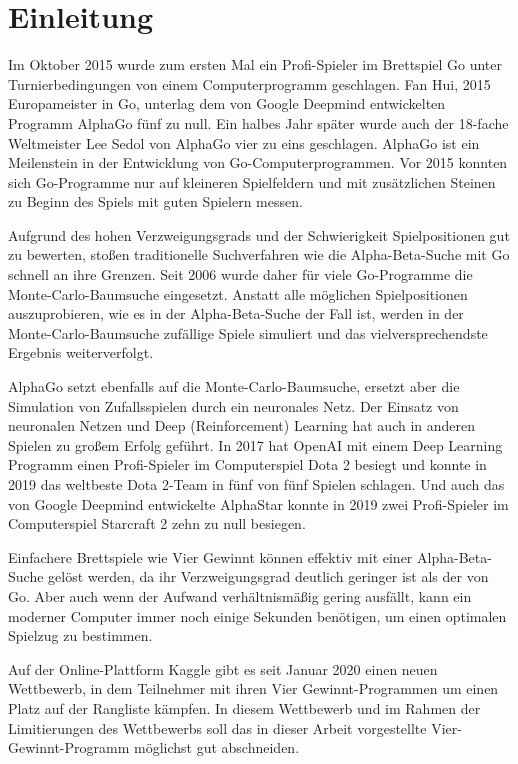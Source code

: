 \section{Einleitung}

Im Oktober 2015 wurde zum ersten Mal ein Profi-Spieler im Brettspiel Go unter Turnierbedingungen von einem Computerprogramm geschlagen. Fan Hui, 2015 Europameister in Go, unterlag dem von Google Deepmind entwickelten Programm AlphaGo fünf zu null. Ein halbes Jahr später wurde auch der 18-fache Weltmeister Lee Sedol von AlphaGo vier zu eins geschlagen.\autocite{AlphaGoStoryFar} AlphaGo ist ein Meilenstein in der Entwicklung von Go-Computerprogrammen. Vor 2015 konnten sich Go-Programme nur auf kleineren Spielfeldern und mit zusätzlichen Steinen zu Beginn des Spiels mit guten Spielern messen.

Aufgrund des hohen Verzweigungsgrads und der Schwierigkeit Spielpositionen gut zu bewerten, stoßen traditionelle Suchverfahren wie die Alpha-Beta-Suche mit Go schnell an ihre Grenzen. Seit 2006 wurde daher für viele Go-Programme die Monte-Carlo-Baumsuche eingesetzt. Anstatt alle möglichen Spielpositionen auszuprobieren, wie es in der Alpha-Beta-Suche der Fall ist, werden in der Monte-Carlo-Baumsuche zufällige Spiele simuliert und das vielversprechendste Ergebnis weiterverfolgt.

AlphaGo setzt ebenfalls auf die Monte-Carlo-Baumsuche, ersetzt aber die Simulation von Zufallsspielen durch ein neuronales Netz. Der Einsatz von neuronalen Netzen und Deep (Reinforcement) Learning hat auch in anderen Spielen zu großem Erfolg geführt. In 2017 hat OpenAI mit einem Deep Learning Programm einen Profi-Spieler im Computerspiel Dota 2 besiegt und konnte in 2019 das weltbeste Dota 2-Team in fünf von fünf Spielen schlagen.\autocite{openaiDotaLargeScale2019} Und auch das von Google Deepmind entwickelte AlphaStar konnte in 2019 zwei Profi-Spieler im Computerspiel Starcraft 2 zehn zu null besiegen.

\bigskip
Einfachere Brettspiele wie Vier Gewinnt können effektiv mit einer Alpha-Beta-Suche gelöst werden, da ihr Verzweigungsgrad deutlich geringer ist als der von Go. Aber auch wenn der Aufwand verhältnismäßig gering ausfällt, kann ein moderner Computer immer noch einige Sekunden benötigen, um einen optimalen Spielzug zu bestimmen.

Auf der Online-Plattform Kaggle gibt es seit Januar 2020 einen neuen Wettbewerb, in dem Teilnehmer mit ihren Vier Gewinnt-Programmen um einen Platz auf der Rangliste kämpfen. In diesem Wettbewerb und im Rahmen der Limitierungen des Wettbewerbs soll das in dieser Arbeit vorgestellte Vier-Gewinnt-Programm möglichst gut abschneiden.

